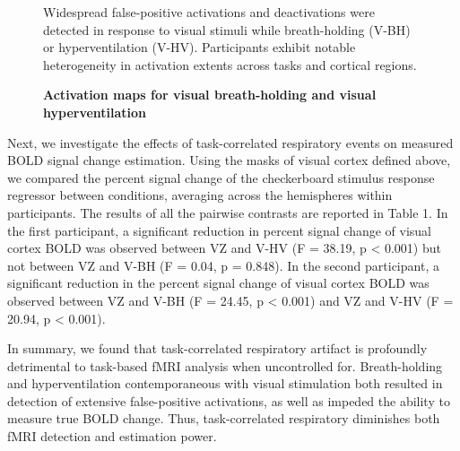 \documentclass[9pt]{NEU502b-fmri}
\begin{document}
\begin{figure}
\centerline{%
%
}
\caption{\textbf{Activation maps for visual breath-holding and visual hyperventilation}}
\par Widespread false-positive activations and deactivations were detected in response to visual stimuli while breath-holding (V-BH) or hyperventilation (V-HV). Participants exhibit notable heterogeneity in activation extents across tasks and cortical regions.

\end{figure}

Next, we investigate the effects of task-correlated respiratory events on measured BOLD signal change estimation. Using the masks of visual cortex defined above, we compared the percent signal change of the checkerboard stimulus response regressor between conditions, averaging across the hemispheres within participants. The results of all the pairwise contrasts are reported in Table 1.  In the first participant, a significant reduction in percent signal change of visual cortex BOLD was observed between VZ and V-HV (F = 38.19, p < 0.001) but not between VZ and V-BH (F = 0.04, p = 0.848). In the second participant, a significant reduction in the percent signal change of visual cortex BOLD was observed between VZ and V-BH (F = 24.45, p < 0.001) and VZ and V-HV (F = 20.94, p < 0.001). 

In summary, we found that task-correlated respiratory artifact is profoundly detrimental to task-based fMRI analysis when uncontrolled for. Breath-holding and hyperventilation contemporaneous with visual stimulation both resulted in detection of extensive false-positive activations, as well as impeded the ability to measure true BOLD change. Thus, task-correlated respiratory diminishes both fMRI detection and estimation power.
\end{document}

